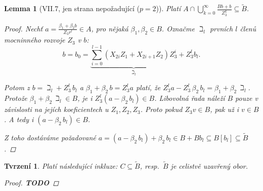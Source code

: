 \documentclass[11pt,a4paper]{article}
\newcommand*{\todo}[1]{\textbf{TODO} #1}
\newcommand*{\mld}[1]{\[#1\]} %
\newcounter{numb}
\theoremstyle{definition}
\theoremstyle{plain}
\newtheorem{lemma}[numb]{Lemma}
\newtheorem{tvrzeni}[numb]{Tvrzení}
\begin{document}
\begin{lemma}[VII.7, jen strana nepožadující ($p = 2$)]
	Platí $A \cap \bigcup_{k = 0}^\infty \frac{B b + b}{Z_3^k} \subseteq \tilde{B}$.

	\begin{proof}
		Nechť $a = \frac{\beta_1 + \beta_2 b}{Z_3r^l} \in A$, pro nějaká $\beta_1, \beta_2 \in B$. Označme $\beth_l$ prvních $l$ členů mocninného rozvoje $Z_3$ v $b$:
		\mld{
			b = b_0 = \underbrace{\sum_{i = 0}^{l - 1} (X_{2i} Z_1 + X_{2i+1} Z_2) Z_3^i}_{\beth_l} + Z_3^l b_l.
		}

		Potom z $b = \beth_l + Z_3^l\,b_l$ a $\beta_1 + \beta_2\,b = Z_3^l a$ platí, že $Z_3^l a - Z_3^l\,\beta_2\,b_l = \beta_1 + \beta_2\,\beth_l$. Protože $\beta_1 + \beta_2\,\beth_l \in B$, je i $Z_3^l (a - \beta_2\,b_l)
		\in B$. Libovolná řada náleží $B$ pouze v závislosti na jejích koeficientech u $Z_1, Z_2, Z_3$. Proto pokud $Z_3 v \in B$, pak už i $v \in B$. A tedy i $(a - \beta_2\,b_l) \in B$.

		Z toho dostáváme požadované $a = (a - \beta_2\,b_l) + \beta_2\,b_l \in B + B b_l \subseteq B[b_l] \subseteq \tilde{B}$.
	\end{proof}
\end{lemma}

\begin{tvrzeni}
	Platí následující inkluze: $C \subseteq \tilde{B}$, resp.\ $\tilde{B}$ je celistvě uzavřený obor.

	\begin{proof}
		\todo
	\end{proof}
\end{tvrzeni}
\end{document}
